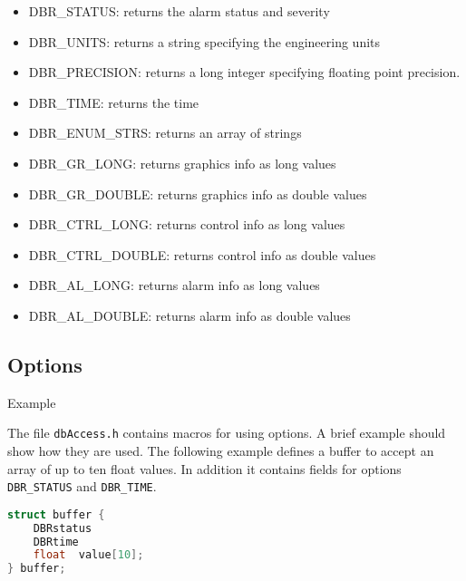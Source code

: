 \begin{itemize}

\item {}DBR\_STATUS: returns the alarm status and severity

\item {}DBR\_UNITS: returns a string specifying the engineering units

\item {}DBR\_PRECISION: returns a long integer specifying floating point precision.

\item {}DBR\_TIME: returns the time

\item {}DBR\_ENUM\_STRS: returns an array of strings

\item {}DBR\_GR\_LONG: returns graphics info as long values

\item {}DBR\_GR\_DOUBLE: returns graphics info as double values

\item {}DBR\_CTRL\_LONG: returns control info as long values

\item {}DBR\_CTRL\_DOUBLE: returns control info as double values

\item {}DBR\_AL\_LONG: returns alarm info as long values

\item {}DBR\_AL\_DOUBLE: returns alarm info as double values

\end{itemize}

\subsection{Options}

Example

The file \verb|dbAccess.h| contains macros for using options.
A brief example should show how they are used.
The following example defines a buffer to accept an array of up to ten float values.
In addition it contains fields for options \verb|DBR_STATUS| and \verb|DBR_TIME|.

\begin{lstlisting}[language=C]
struct buffer {
    DBRstatus
    DBRtime
    float  value[10];
} buffer;
\end{lstlisting}

